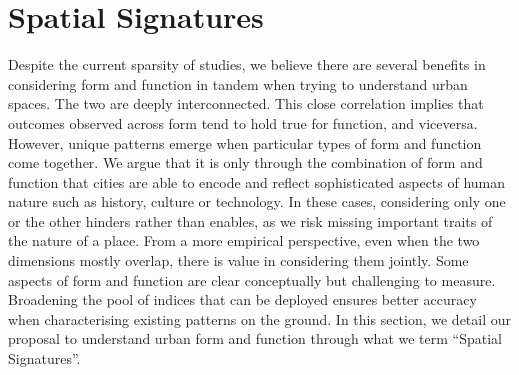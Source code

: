 \section{Spatial Signatures}
\label{sec:ss}

Despite the current sparsity of studies, we believe there are several benefits
in considering form and function in tandem when trying to understand urban
spaces.
The two are deeply interconnected. This close
correlation implies that outcomes observed across form tend to hold true for
function, and viceversa. However, unique patterns emerge when particular types
of form and function come together. 
We argue that it is only through the combination of form and function
that cities are able to encode and reflect sophisticated aspects of human
nature such as history, culture or technology.
%
In these cases, considering only one or the other hinders rather than enables,
as we risk missing important traits of the nature of a place.
From a more empirical perspective, even when the two dimensions mostly
overlap, there is value in considering them jointly. Some aspects of form and
function are clear conceptually but challenging to measure. Broadening the
pool of indices that can be deployed ensures better accuracy when
characterising existing patterns on the ground.
%
In this section, we detail our proposal to understand urban form and function
through what we term “Spatial Signatures”. 

